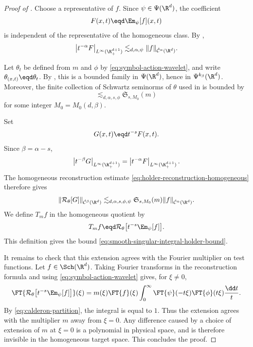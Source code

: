 \begin{proof}[Proof of ]
  Choose a representative of \(f\). Since \(\psi \in \Psi(\R^d)\), the
  coefficient
  \[
    F(x,t) \eqd \Em_{\psi}[f](x,t)
  \]
  is independent of the representative of the homogeneous class. By
  ,
  \begin{equation}
    \label{eq:singular-integral-analysis-size}
    \left|t^{-\alpha}F\right|_{L^{\infty}(\R^{d + 1}_+)}
    \lesssim_{d, \alpha, \psi}
    \|f\|_{\dot{\mathcal{C}}^{\alpha}(\R^d)}.
  \end{equation}

  Let \(\theta_t\) be defined from \(m\) and \(\phi\) by
  \eqref{eq:symbol-action-wavelet}, and write
  \(\theta_{(x,t)} \eqd \theta_t\). By
  , this is a bounded family in
  \(\Psi(\R^d)\), hence in \(\Psi^{k_{\beta}}(\R^d)\). Moreover, the finite
  collection of Schwartz seminorms of \(\theta\) used in
   is bounded by
  \[
    \lesssim_{d, \alpha, s, \phi}
    \mathfrak{S}_{s, M_0}(m)
  \]
  for some integer \(M_0 = M_0(d,\beta)\).

  Set
  \[
    G(x,t) \eqd t^{-s}F(x,t).
  \]
  Since \(\beta = \alpha - s\),
  \[
    \left|t^{-\beta}G\right|_{L^{\infty}(\R^{d + 1}_+)}
    =
    \left|t^{-\alpha}F\right|_{L^{\infty}(\R^{d + 1}_+)}.
  \]
  The homogeneous reconstruction estimate
  \eqref{eq:holder-reconstruction-homogeneous} therefore gives
  \[
    \|\mathcal{R}_{\theta}[G]\|_{\dot{\mathcal{C}}^{\beta}(\R^d)}
    \lesssim_{d, \alpha, s, \phi, \psi}
    \mathfrak{S}_{s, M_0}(m)
    \|f\|_{\dot{\mathcal{C}}^{\alpha}(\R^d)}.
  \]
  We define \(T_m f\) in the homogeneous quotient by
  \begin{equation}
    \label{eq:smooth-singular-integral-extension}
    T_m f
    \eqd
    \mathcal{R}_{\theta}
    \bigl[t^{-s}\Em_{\psi}[f]\bigr].
  \end{equation}
  This definition gives the bound
  \eqref{eq:smooth-singular-integral-holder-bound}.

  It remains to check that this extension agrees with the Fourier multiplier
  on test functions. Let \(f \in \Sch(\R^d)\). Taking Fourier transforms in
  the reconstruction formula and using \eqref{eq:symbol-action-wavelet} gives,
  for \(\xi \neq 0\),
  \[
    \FT{
      \mathcal{R}_{\theta}
      \bigl[t^{-s}\Em_{\psi}[f]\bigr]
    }(\xi)
    =
    m(\xi)\FT{f}(\xi)
    \int_0^{\infty}
    \FT{\psi}(-t\xi)\FT{\phi}(t\xi)
    \frac{\dd t}{t}.
  \]
  By \eqref{eq:calderon-partition}, the integral is equal to \(1\). Thus the
  extension agrees with the multiplier \(m\) away from \(\xi = 0\). Any
  difference caused by a choice of extension of \(m\) at \(\xi=0\) is a
  polynomial in physical space, and is therefore invisible in the homogeneous
  target space. This concludes the proof.
\end{proof}


